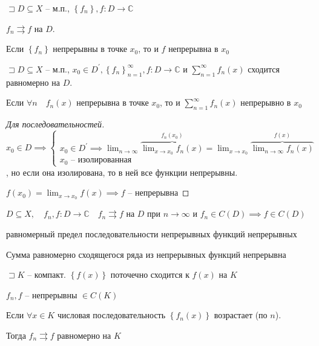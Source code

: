 \documentclass{book}
\renewcommand\C{\ensuremath{\mathbb{C}}}
\newcommand{\p}[1]{#1^{\prime}}
\theoremstyle{definition}
\begin{document}
    \begin{corollary}

         $\sqsupset D\subseteq X$ -- м.п., $\left\{ f_n \right\} , f:D \to \C$

         $f_n\rightrightarrows f$ на  $D$.

         Если  $\left\{ f_n \right\} $ непрерывны в точке $x_0$, то и $f$ непрерывна в  $x_0$
    \end{corollary}
    \begin{corollary}

        $\sqsupset D\subseteq X$ -- м.п., $x_0\in \p D,   \left\{ f_n \right\}_{n=1}^{\infty } , f:D \to \C$ и $\sum_{n=1}^{\infty } f_n(x)$ сходится равномерно на $D$.

        Если  $\forall n\quad f_n(x)$ непрерывна в точке $x_0$, то и $\sum_{n=1}^{\infty } f_n(x)$ непрерывно в $x_0$
    \end{corollary}
    \begin{proof}
        [Для последовательностей]

        $x_0\in D \implies \begin{cases}
            x_0\in \p D \implies \lim_{n \to \infty} \overbrace{\lim_{x \to x_0} f_n(x)}^{f_n(x_0)} = \lim_{x \to x_0} \overbrace{\lim_{n \to \infty} f_n(x)}^{f(x)}\\
            x_0 \text{ -- изолированная}
        \end{cases}$, но если она изолирована, то в ней все функции непрерывны.

        $f(x_0) = \lim_{x \to x_0} f(x) \implies f$ -- непрерывна
    \end{proof}

    \begin{corollary} 
        $D\subseteq X,\quad f_n, f: D \to \C\quad f_n\rightrightarrows f$ на $D$ при  $n\to \infty $ и $f_n\in C(D) \implies f\in C(D)$

        равномерный предел последовательности непрерывных функций непрерывных
    \end{corollary}

    \begin{corollary}
        Сумма равномерно сходящегося ряда из непрерывных функций непрерывна
    \end{corollary}

    \begin{theorem}
        [Дини]

        $\sqsupset K$ -- компакт. $\left\{ f(x) \right\} $ поточечно сходится к $f(x)$ на  $K$

        $f_n, f$ -- непрерывны  $\in C(K)$

        Если  $\forall x\in K$ числовая последовательность $\left\{ f_n(x) \right\} $ возрастает (по $n$).

        Тогда  $f_n \rightrightarrows f$ равномерно на  $K$
    \end{theorem}
\end{document}

